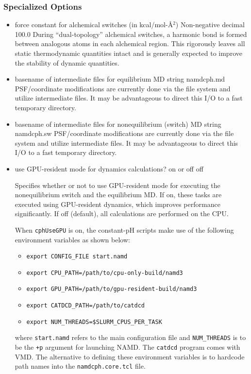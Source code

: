 \subsubsection{Specialized Options}
\begin{itemize}
\item {}
{force constant for alchemical switches (in kcal/mol-\AA$^2$)}
{Non-negative decimal}
{100.0}
{
During ``dual-topology'' alchemical switches, a harmonic bond is formed between
  analogous atoms in each alchemical region.
This rigorously leaves all static thermodynamic quantities intact and is
  generally expected to improve the stability of dynamic quantities.
}

\item {}
{basename of intermediate files for equilibrium MD}
{string}
{namdcph.md}
{
PSF/coordinate modifications are currently done via the file system and utilize 
  intermediate files.
It may be advantageous to direct this I/O to a fast temporary directory.
}

\item {}
{basename of intermediate files for nonequilibrium (switch) MD}
{string}
{namdcph.sw}
{
PSF/coordinate modifications are currently done via the file system and utilize
  intermediate files.
It may be advantageous to direct this I/O to a fast temporary directory.
}

\item {}
{use GPU-resident mode for dynamics calculations?}
{on or off}
{off}
{
Specifies whether or not to use GPU-resident mode for executing
the nonequilibrium switch and the equilibrium MD.
If on, these tasks are executed using GPU-resident dynamics, 
which improves performance significantly. 
If off (default), all calculations are performed on the CPU.

When {\tt cphUseGPU} is on, the constant-pH scripts make use of
the following environment variables as shown below:
\begin{itemize}
  \item {\tt export CONFIG\_FILE start.namd}
  \item {\tt export CPU\_PATH=/path/to/cpu-only-build/namd3}
  \item {\tt export GPU\_PATH=/path/to/gpu-resident-build/namd3}
  \item {\tt export CATDCD\_PATH=/path/to/catdcd}
  \item {\tt export NUM\_THREADS=\$SLURM\_CPUS\_PER\_TASK}
\end{itemize}
where {\tt start.namd} refers to the main configuration file and 
{\tt NUM\_THREADS} is to be the {\tt +p} argument for launching NAMD. 
The {\tt catdcd} program comes with VMD. 
The alternative to defining these environment variables is to 
hardcode path names into the {\tt namdcph.core.tcl} file. 

}
\end{itemize}
